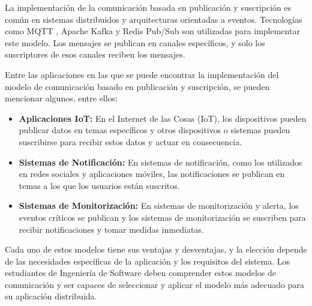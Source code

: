 			La implementación de la comunicación basada en publicación y suscripción es común en sistemas distribuidos y arquitecturas orientadas a eventos. Tecnologías como MQTT \cite{Sharma2024Efficient}, Apache Kafka \cite{Raptis2023Survey} y Redis \cite{Maharjan2023Benchmarking} Pub/Sub son utilizadas para implementar este modelo. Los mensajes se publican en canales específicos, y solo los suscriptores de esos canales reciben los mensajes.
			
			Entre las aplicaciones en las que se puede encontrar la implementación del modelo de comunicación basado en publicación y suscripción, se pueden mencionar algunos, entre ellos:
			
			\begin{itemize}
				\item \textbf{Aplicaciones IoT:} En el Internet de las Cosas (IoT), los dispositivos pueden publicar datos en temas específicos y otros dispositivos o sistemas pueden suscribirse para recibir estos datos y actuar en consecuencia.
				\item \textbf{Sistemas de Notificación:} En sistemas de notificación, como los utilizados en redes sociales y aplicaciones móviles, las notificaciones se publican en temas a los que los usuarios están suscritos.
				\item \textbf{Sistemas de Monitorización:} En sistemas de monitorización y alerta, los eventos críticos se publican y los sistemas de monitorización se suscriben para recibir notificaciones y tomar medidas inmediatas.
			\end{itemize}
			
		\begin{tcolorbox}[colback=yellow!10!white, colframe=lightblue!50!white, title=Concluyendo, coltitle=blue]
			Cada uno de estos modelos tiene sus ventajas y desventajas, y la elección depende de las necesidades específicas de la aplicación y los requisitos del sistema. Los estudiantes de Ingeniería de Software deben comprender estos modelos de comunicación y ser capaces de seleccionar y aplicar el modelo más adecuado para su aplicación distribuida.
		\end{tcolorbox}
